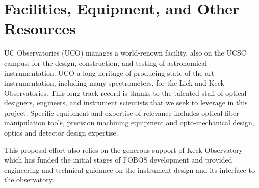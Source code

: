 \documentclass[oneside,11pt]{amsart}
\begin{document}
\clearpage




\newpage




\section{Facilities, Equipment, and Other Resources}


UC Observatories (UCO) manages a world-renown facility, also on the UCSC campus, for the design, construction, and
testing of astronomical instrumentation.  UCO a long heritage of producing state-of-the-art instrumentation, including
many spectrometers, for the Lick and Keck Observatories.  This long track record is thanks to the talented staff of
optical designers, engineers, and instrument scientists that we seek to leverage in this project.  Specific equipment
and expertise of relevance includes optical fiber manipulation tools, precision machining equipment and opto-mechanical
design, optics and detector design expertise.

This proposal effort also relies on the generous support of Keck Observatory which has funded the initial stages of FOBOS development and provided engineering and technical guidance on the instrument design and its interface to the observatory.  
\end{document}
